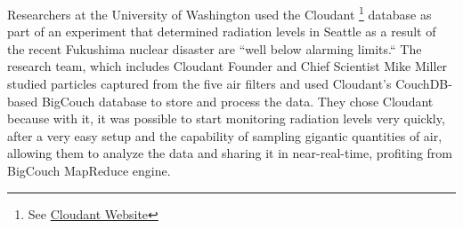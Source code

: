 Researchers at the University of Washington used the Cloudant \footnote{See \href{https://cloudant.com/}{Cloudant Website}} database as part of an experiment that determined radiation levels in Seattle as a result of the recent Fukushima nuclear disaster are ``well below alarming limits.`` The research team, which includes Cloudant Founder and Chief Scientist Mike Miller studied particles captured from the five air filters and used Cloudant’s CouchDB-based BigCouch database to store and process the data. They chose Cloudant because with it, it was possible to start monitoring radiation levels very quickly, after a very easy setup and the capability of sampling gigantic quantities of air, allowing them to analyze the data and sharing it in near-real-time, profiting from BigCouch MapReduce engine.
